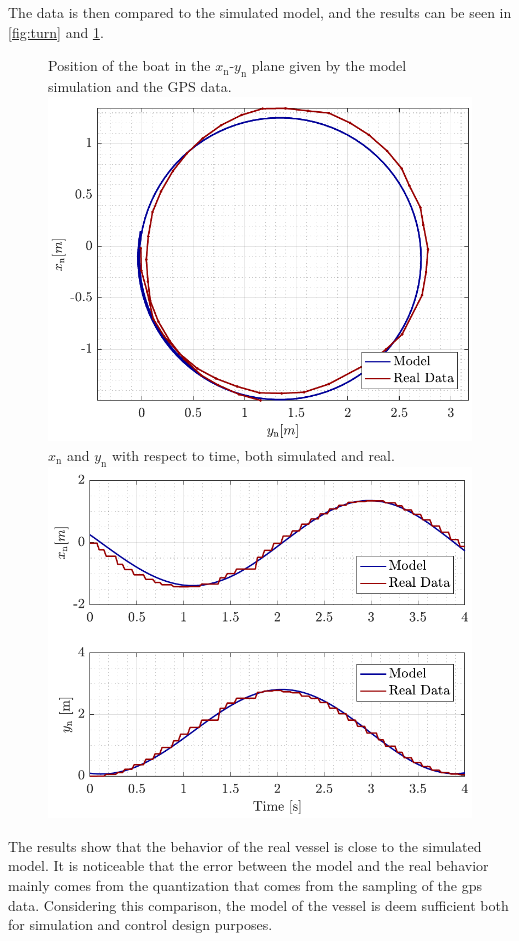The data is then compared to the simulated model, and the results can be seen in \autoref{fig:turn} and \ref{fig:turn_time}.

\begin{figure}[H]
    \captionbox 
    {   
        Position of the boat in the $x_\mathrm{n}$-$y_\mathrm{n}$ plane given by the model simulation and the GPS data.
        \label{fig:turn}
    }                                                                 
    {                                                                  
        \includegraphics[width=.45\textwidth]{figures/turn}         
    }                                                                    
    \hspace{5pt}                                                          
    \captionbox  
    {      
        $x_\mathrm{n}$ and $y_\mathrm{n}$ with respect to time, both simulated and real.
        \label{fig:turn_time}
    }                                                                        
    {
        \includegraphics[width=.45\textwidth]{figures/turn_time}
    }
\end{figure}

The results show that the behavior of the real vessel is close to the simulated model. It is noticeable that the error between the model and the  real behavior mainly comes from the quantization that comes from the sampling of the gps data. Considering this comparison, the model of the vessel is deem sufficient both for simulation and control design purposes. 
